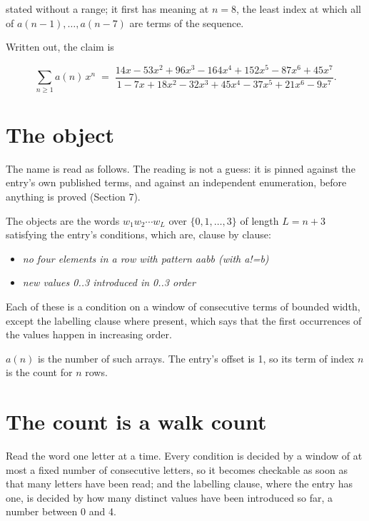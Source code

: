 \documentclass[11pt]{article}
\theoremstyle{definition}
\begin{document}
stated without a range; it first has meaning at $n = 8$, the least index at which all of $a(n-1),\dots,a(n-7)$ are terms of the sequence.

Written out, the claim is

\[\sum_{n \ge 1} a(n)\,x^n \;=\; \frac{14x - 53x^{2} + 96x^{3} - 164x^{4} + 152x^{5} - 87x^{6} + 45x^{7}}{1 - 7x + 18x^{2} - 32x^{3} + 45x^{4} - 37x^{5} + 21x^{6} - 9x^{7}}.\]

\section{The object}

The name is read as follows. The reading is not a guess: it is pinned against the entry's own published terms, and against an independent enumeration, before anything is proved (Section 7).

The objects are the words $w_1 w_2 \cdots w_L$ over $\{0,1,\dots,3\}$ of length $L = n + 3$ satisfying the entry's conditions, which are, clause by clause:

\begin{itemize}

\item {\itshape no four elements in a row with pattern aabb (with a!=b)}

\item {\itshape new values 0..3 introduced in 0..3 order}

\end{itemize}

Each of these is a condition on a window of consecutive terms of bounded width, except the labelling clause where present, which says that the first occurrences of the values happen in increasing order.

$a(n)$ is the number of such arrays. The entry's offset is 1, so its term of index $n$ is the count for $n$ rows.

\section{The count is a walk count}

Read the word one letter at a time. Every condition is decided by a window of at most a fixed number of consecutive letters, so it becomes checkable as soon as that many letters have been read; and the labelling clause, where the entry has one, is decided by how many distinct values have been introduced so far, a number between $0$ and 4.
\end{document}
